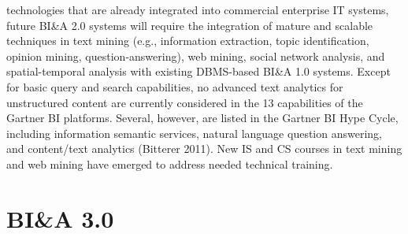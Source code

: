 technologies that are already integrated into commercial
enterprise IT systems, future BI\&A 2.0 systems will require
the integration of mature and scalable techniques in text
mining (e.g., information extraction, topic identification,
opinion mining, question-answering), web mining, social
network analysis, and spatial-temporal analysis with existing
DBMS-based BI\&A 1.0 systems.
Except for basic query and search capabilities, no advanced
text analytics for unstructured content are currently considered in the 13 capabilities of the Gartner BI platforms.
Several, however, are listed in the Gartner BI Hype Cycle,
including information semantic services, natural language
question answering, and content/text analytics (Bitterer 2011). 
New IS and CS courses in text mining and web mining have
emerged to address needed technical training.

\section*{BI\&A 3.0}
